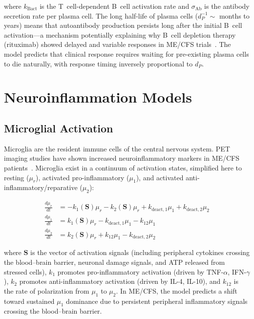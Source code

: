 where $k_{\text{Bact}}$ is the T~cell-dependent B~cell activation rate and $\sigma_{\text{Ab}}$ is the antibody secretion rate per plasma cell. The long half-life of plasma cells ($d_P^{-1} \sim$ months to years) means that autoantibody production persists long after the initial B~cell activation---a mechanism potentially explaining why B~cell depletion therapy (rituximab) showed delayed and variable responses in ME/CFS trials~\cite{Fluge2011rituximab,Fluge2015rituximab_rct,Fluge2019}. The model predicts that clinical response requires waiting for pre-existing plasma cells to die naturally, with response timing inversely proportional to $d_P$.

\section{Neuroinflammation Models}
\label{sec:neuroinflammation-models}

\subsection{Microglial Activation}
\label{sec:microglia-model}

Microglia are the resident immune cells of the central nervous system. PET imaging studies have shown increased neuroinflammatory markers in ME/CFS patients~\cite{Raijmakers2021Neuroinflammation}. Microglia exist in a continuum of activation states, simplified here to resting ($\mu_r$), activated pro-inflammatory ($\mu_1$), and activated anti-inflammatory/reparative ($\mu_2$):

\begin{align}
\label{eq:microglia}
\frac{d\mu_r}{dt} &= -k_1(\boldsymbol{S}) \mu_r - k_2(\boldsymbol{S}) \mu_r + k_{\text{deact},1} \mu_1 + k_{\text{deact},2} \mu_2 \\
\frac{d\mu_1}{dt} &= k_1(\boldsymbol{S}) \mu_r - k_{\text{deact},1} \mu_1 - k_{12} \mu_1 \\
\frac{d\mu_2}{dt} &= k_2(\boldsymbol{S}) \mu_r + k_{12} \mu_1 - k_{\text{deact},2} \mu_2
\end{align}

where $\boldsymbol{S}$ is the vector of activation signals (including peripheral cytokines crossing the blood--brain barrier, neuronal damage signals, and ATP released from stressed cells), $k_1$ promotes pro-inflammatory activation (driven by TNF-$\alpha$, IFN-$\gamma$), $k_2$ promotes anti-inflammatory activation (driven by IL-4, IL-10), and $k_{12}$ is the rate of polarization from $\mu_1$ to $\mu_2$. In ME/CFS, the model predicts a shift toward sustained $\mu_1$ dominance due to persistent peripheral inflammatory signals crossing the blood--brain barrier.


